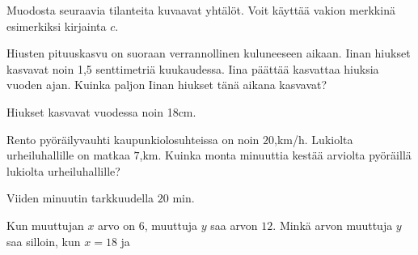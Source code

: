 \begin{tehtavasivu}
\begin{tehtava}
Muodosta seuraavia tilanteita kuvaavat yhtälöt. Voit käyttää vakion merkkinä esimerkiksi kirjainta $c$. %
\begin{alakohdat}
\end{alakohdat}
\begin{vastaus}
\begin{alakohdat}
\end{alakohdat}
\end{vastaus}
\end{tehtava}

\begin{tehtava}
Hiusten pituuskasvu on suoraan verrannollinen kuluneeseen aikaan. Iinan hiukset kasvavat noin 1,5 senttimetriä kuukaudessa. Iina päättää kasvattaa hiuksia vuoden ajan. Kuinka paljon Iinan hiukset tänä aikana kasvavat?
\begin{vastaus}
Hiukset kasvavat vuodessa noin 18cm.
\end{vastaus}
\end{tehtava}

\begin{tehtava}
Rento pyöräilyvauhti kaupunkiolosuhteissa on noin $20$,km/h. Lukiolta urheiluhallille on matkaa $7$,km. Kuinka monta minuuttia kestää arviolta pyöräillä lukiolta urheiluhallille?
\begin{vastaus}
Viiden minuutin tarkkuudella $20$ min.
\end{vastaus}
\end{tehtava}

\begin{tehtava}
Kun muuttujan $ x $ arvo on $ 6 $, muuttuja $ y $ saa arvon $ 12 $. Minkä arvon muuttuja $ y $ saa silloin, kun $ x=18 $ ja
	\begin{alakohdat}
\end{alakohdat} 
	\begin{vastaus}
		\begin{alakohdat}
\end{alakohdat} 
	\end{vastaus}
\end{tehtava}


\end{tehtavasivu}
